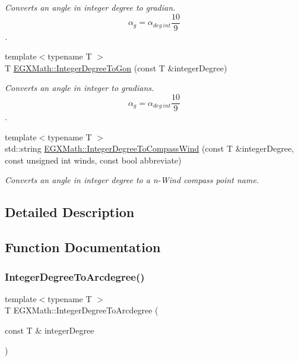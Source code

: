 \begin{DoxyCompactItemize}
\begin{DoxyCompactList}\small\item\em Converts an angle in integer degree to gradian. \[\alpha_{g}=\alpha_{deg\ int}\frac{10}{9}\]. \end{DoxyCompactList}\item 
{\footnotesize template$<$typename T $>$ }\\T \mbox{\hyperlink{group___e_g_x_math-_angle_conversions-_integer_degree_ga6e5be425c37ad27319f09329156c64bb}{E\+G\+X\+Math\+::\+Integer\+Degree\+To\+Gon}} (const T \&integer\+Degree)
\begin{DoxyCompactList}\small\item\em Converts an angle in integer to gradians. \[\alpha_{g}=\alpha_{deg\ int}\frac{10}{9}\]. \end{DoxyCompactList}\item 
{\footnotesize template$<$typename T $>$ }\\std\+::string \mbox{\hyperlink{group___e_g_x_math-_angle_conversions-_integer_degree_ga01abeefd29282a3c88d3d3c28fd2c6fa}{E\+G\+X\+Math\+::\+Integer\+Degree\+To\+Compass\+Wind}} (const T \&integer\+Degree, const unsigned int winds, const bool abbreviate)
\begin{DoxyCompactList}\small\item\em Converts an angle in integer degree to a n-\/\+Wind compass point name. \end{DoxyCompactList}\end{DoxyCompactItemize}


\subsection{Detailed Description}


\subsection{Function Documentation}
\mbox{\label{group___e_g_x_math-_angle_conversions-_integer_degree_gaf633d0b82bfb7586ce86ffbcf78d8f7a}} 
\subsubsection{\texorpdfstring{Integer\+Degree\+To\+Arcdegree()}{IntegerDegreeToArcdegree()}}
{\footnotesize\ttfamily template$<$typename T $>$ \\
T E\+G\+X\+Math\+::\+Integer\+Degree\+To\+Arcdegree (\begin{DoxyParamCaption}\item[{const T \&}]{integer\+Degree }\end{DoxyParamCaption})}



